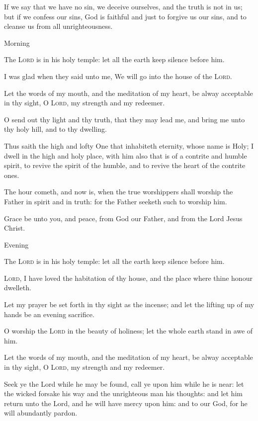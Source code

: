 \begin{multicols}{2}
    If we say that we have no sin, we deceive ourselves, and the truth is not in us; but if we confess our sins, God is faithful and just to forgive us our sins, and to cleanse us from all unrighteousness.
\begin{inhead}
Morning
\end{inhead}\noindent
    The \textsc{Lord} is in his holy temple: let all the earth keep silence before him.\par
    I was glad when they said unto me, We will go into the house of the \textsc{Lord}.\par
    Let the words of my mouth, and the meditation of my heart, be alway acceptable in thy sight, O \textsc{Lord}, my strength and my redeemer.\par
    O send out thy light and thy truth, that they may lead me, and bring me unto thy holy hill, and to thy dwelling.\par
    Thus saith the high and lofty One that inhabiteth eternity, whose name is Holy; I dwell in the high and holy place, with him also that is of a contrite and humble spirit, to revive the spirit of the humble, and to revive the heart of the contrite ones.\par
    The hour cometh, and now is, when the true worshippers shall worship the Father in spirit and in truth: for the Father seeketh such to worship him.\par
    Grace be unto you, and peace, from God our Father, and from the Lord Jesus Christ.\par
\begin{inhead}
Evening
\end{inhead}\noindent
    The \textsc{Lord} is in his holy temple: let all the earth keep silence before him.\par
    \textsc{Lord}, I have loved the habitation of thy house, and the place where thine honour dwelleth.\par
    Let my prayer be set forth in thy sight as the incense; and let the lifting up of my hands be an evening sacrifice.\par
    O worship the \textsc{Lord} in the beauty of holiness; let the whole earth stand in awe of him.\par
    Let the words of my mouth, and the meditation of my heart, be alway acceptable in thy sight, O \textsc{Lord}, my strength and my redeemer.\par
    Seek ye the Lord while he may be found, call ye upon him while he is near: let the wicked forsake his way and the unrighteous man his thoughts: and let him return unto the Lord, and he will have mercy upon him: and to our God, for he will abundantly pardon.
    

\end{multicols}
